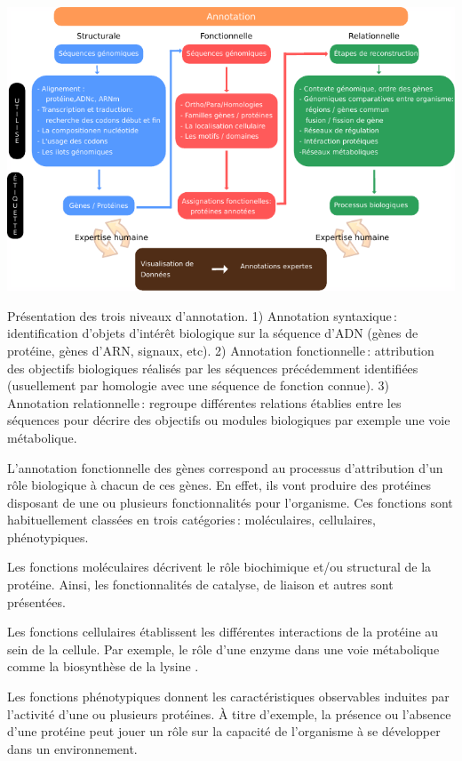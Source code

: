 \begin{refsegment}
    \begin{shadedfigure}[H]
        \centering
        \includegraphics[width=\textwidth]{img/niveaux_annotations.pdf}
        \caption{Présentation des trois niveaux d'annotation. 1) Annotation syntaxique : identification d'objets d'intérêt biologique sur la séquence d'ADN (gènes de protéine, gènes d'ARN, signaux, etc). 2) Annotation fonctionnelle : attribution des objectifs biologiques réalisés par les séquences précédemment identifiées (usuellement par homologie avec une séquence de fonction connue). 3) Annotation relationnelle : regroupe différentes relations établies entre les séquences pour décrire des objectifs ou modules biologiques par exemple une voie métabolique.  }
        \label{fig:niveaux_annotation}
    \end{shadedfigure}
    
    L'annotation fonctionnelle des gènes correspond au processus d'attribution d'un rôle biologique à chacun de ces gènes. En effet, ils vont produire des protéines disposant de une ou plusieurs fonctionnalités pour l'organisme. Ces fonctions sont habituellement classées en trois catégories : moléculaires, cellulaires, phénotypiques.
    
    Les fonctions moléculaires décrivent le rôle biochimique et/ou structural de la protéine. Ainsi, les fonctionnalités de catalyse, de liaison et autres sont présentées.
    
    Les fonctions cellulaires établissent les différentes interactions de la protéine au sein de la cellule. Par exemple, le rôle d'une enzyme dans une voie métabolique comme la biosynthèse de la lysine . 
    
    Les fonctions phénotypiques donnent les caractéristiques observables induites par l'activité d'une ou plusieurs protéines. À titre d'exemple, la présence ou l'absence d'une protéine peut jouer un rôle sur la capacité de l'organisme à se développer dans un environnement.
    

\end{refsegment}
